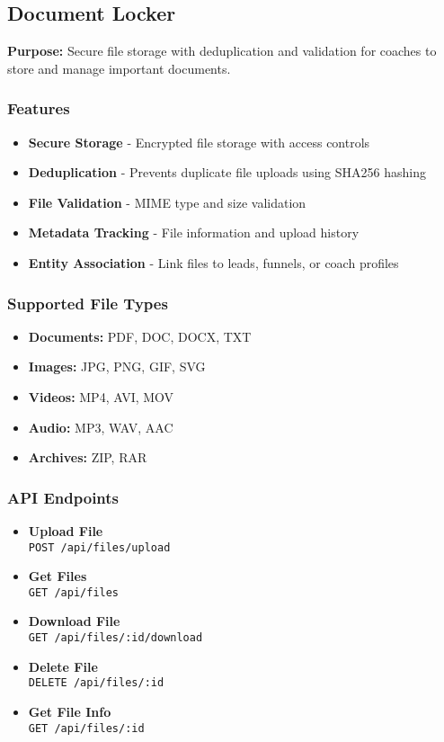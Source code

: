 \documentclass[12pt,a4paper]{article}
\newcommand{\apiendpoint}[2]{\textbf{#1} \\ \texttt{#2}}
\begin{document}
\subsection{Document Locker}
\textbf{Purpose:} Secure file storage with deduplication and validation for coaches to store and manage important documents.

\subsubsection{Features}
\begin{itemize}
    \item \textbf{Secure Storage} - Encrypted file storage with access controls
    \item \textbf{Deduplication} - Prevents duplicate file uploads using SHA256 hashing
    \item \textbf{File Validation} - MIME type and size validation
    \item \textbf{Metadata Tracking} - File information and upload history
    \item \textbf{Entity Association} - Link files to leads, funnels, or coach profiles
\end{itemize}

\subsubsection{Supported File Types}
\begin{itemize}
    \item \textbf{Documents:} PDF, DOC, DOCX, TXT
    \item \textbf{Images:} JPG, PNG, GIF, SVG
    \item \textbf{Videos:} MP4, AVI, MOV
    \item \textbf{Audio:} MP3, WAV, AAC
    \item \textbf{Archives:} ZIP, RAR
\end{itemize}

\subsubsection{API Endpoints}
\begin{itemize}
    \item \apiendpoint{Upload File}{POST /api/files/upload}
    \item \apiendpoint{Get Files}{GET /api/files}
    \item \apiendpoint{Download File}{GET /api/files/:id/download}
    \item \apiendpoint{Delete File}{DELETE /api/files/:id}
    \item \apiendpoint{Get File Info}{GET /api/files/:id}
\end{itemize}
\end{document}
